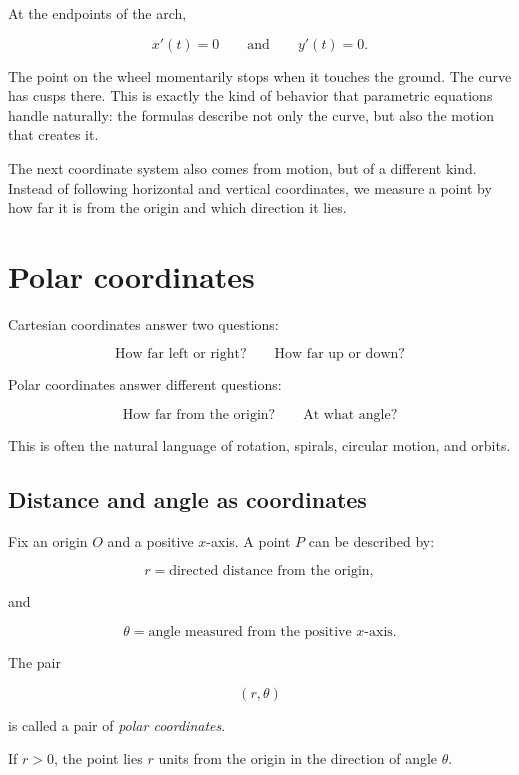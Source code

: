 At the endpoints of the arch,

\[
x'(t)=0
\qquad\text{and}\qquad
y'(t)=0.
\]

The point on the wheel momentarily stops when it touches the ground.  The curve has
cusps there.  This is exactly the kind of behavior that parametric equations handle
naturally: the formulas describe not only the curve, but also the motion that creates it.

The next coordinate system also comes from motion, but of a different kind.  Instead of
following horizontal and vertical coordinates, we measure a point by how far it is from
the origin and which direction it lies.

\section{Polar coordinates}
\label{sec:polar-coordinates}

Cartesian coordinates answer two questions:

\[
\text{How far left or right?}
\qquad
\text{How far up or down?}
\]

Polar coordinates answer different questions:

\[
\text{How far from the origin?}
\qquad
\text{At what angle?}
\]

This is often the natural language of rotation, spirals, circular motion, and orbits.

\subsection{Distance and angle as coordinates}
\label{subsec:distance-angle-coordinates}

Fix an origin \(O\) and a positive \(x\)-axis.  A point \(P\) can be described by:

\[
r=\text{directed distance from the origin},
\]

and

\[
\theta=\text{angle measured from the positive \(x\)-axis}.
\]

The pair

\[
(r,\theta)
\]

is called a pair of \emph{polar coordinates}.

If \(r>0\), the point lies \(r\) units from the origin in the direction of angle \(\theta\).


